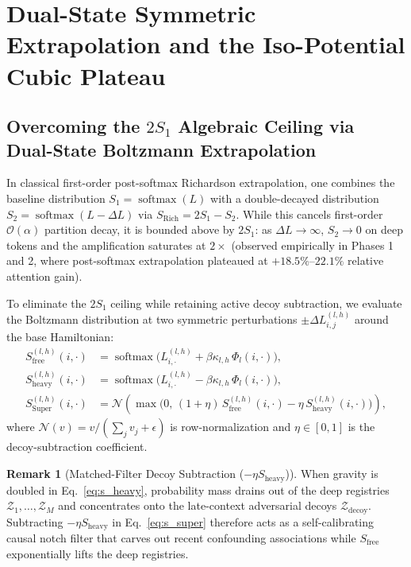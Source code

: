\documentclass[11pt,letterpaper]{article}
\theoremstyle{definition}
\newtheorem{remark}[theorem]{Remark}
\begin{document}
\section{Dual-State Symmetric Extrapolation and the Iso-Potential Cubic Plateau}

\subsection{Overcoming the \texorpdfstring{$2S_1$}{2S1} Algebraic Ceiling via Dual-State Boltzmann Extrapolation}
In classical first-order post-softmax Richardson extrapolation, one combines the baseline distribution $S_1 = \operatorname{softmax}(L)$ with a double-decayed distribution $S_2 = \operatorname{softmax}(L - \Delta L)$ via $S_{\text{Rich}} = 2 S_1 - S_2$. While this cancels first-order $\mathcal{O}(\alpha)$ partition decay, it is bounded above by $2 S_1$: as $\Delta L \to \infty$, $S_2 \to 0$ on deep tokens and the amplification saturates at $2\times$ (observed empirically in Phases 1 and 2, where post-softmax extrapolation plateaued at $+18.5\%\text{--}22.1\%$ relative attention gain).

To eliminate the $2 S_1$ ceiling while retaining active decoy subtraction, we evaluate the Boltzmann distribution at two symmetric perturbations $\pm \Delta L^{(l,h)}_{i,j}$ around the base Hamiltonian:
\begin{align}
    S_{\text{free}}^{(l,h)}(i, \cdot) &= \operatorname{softmax}\!\Big(L^{(l,h)}_{i, \cdot} + \beta \kappa_{l,h}\, \Phi_l(i, \cdot)\Big), \label{eq:s_free} \\
    S_{\text{heavy}}^{(l,h)}(i, \cdot) &= \operatorname{softmax}\!\Big(L^{(l,h)}_{i, \cdot} - \beta \kappa_{l,h}\, \Phi_l(i, \cdot)\Big), \label{eq:s_heavy} \\
    S_{\text{Super}}^{(l,h)}(i, \cdot) &= \mathcal{N}\!\left(\max\!\Big(0, \, (1 + \eta)\, S_{\text{free}}^{(l,h)}(i, \cdot) - \eta\, S_{\text{heavy}}^{(l,h)}(i, \cdot)\Big)\right), \label{eq:s_super}
\end{align}
where $\mathcal{N}(v) = v / (\sum_j v_j + \epsilon)$ is row-normalization and $\eta \in [0, 1]$ is the decoy-subtraction coefficient.

\begin{remark}[Matched-Filter Decoy Subtraction ($-\eta S_{\text{heavy}}$)]
When gravity is doubled in Eq.~\eqref{eq:s_heavy}, probability mass drains out of the deep registries $\mathcal{Z}_1, \dots, \mathcal{Z}_M$ and concentrates onto the late-context adversarial decoys $\mathcal{Z}_{\text{decoy}}$. Subtracting $-\eta S_{\text{heavy}}$ in Eq.~\eqref{eq:s_super} therefore acts as a self-calibrating causal notch filter that carves out recent confounding associations while $S_{\text{free}}$ exponentially lifts the deep registries.
\end{remark}
\end{document}
